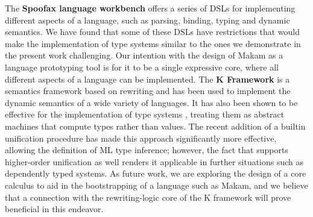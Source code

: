 The \textbf{Spoofax language workbench} \citep{spoofax-main-reference}
offers a series of DSLs for implementing different aspects of a
language, such as parsing, binding, typing and dynamic semantics. We
have found that some of these DSLs have restrictions that would make the
implementation of type systems similar to the ones we demonstrate in the
present work challenging. Our intention with the design of Makam as a
language prototyping tool is for it to be a single expressive core,
where all different aspects of a language can be implemented. The
\textbf{K Framework} \citep{k-framework-main-reference} is a semantics
framework based on rewriting and has been used to implement the dynamic
semantics of a wide variety of languages. It has also been shown to be
effective for the implementation of type systems
\citep{k-framework-type-systems}, treating them as abstract machines
that compute types rather than values. The recent addition of a builtin
unification procedure has made this approach significantly more
effective, allowing the definition of ML type inference; however, the
fact that \lamprolog supports higher-order unification as well renders
it applicable in further situations such as dependently typed systems.
As future work, we are exploring the design of a core calculus to aid in
the bootstrapping of a language such as Makam, and we believe that a
connection with the rewriting-logic core of the K framework will prove
beneficial in this endeavor.
